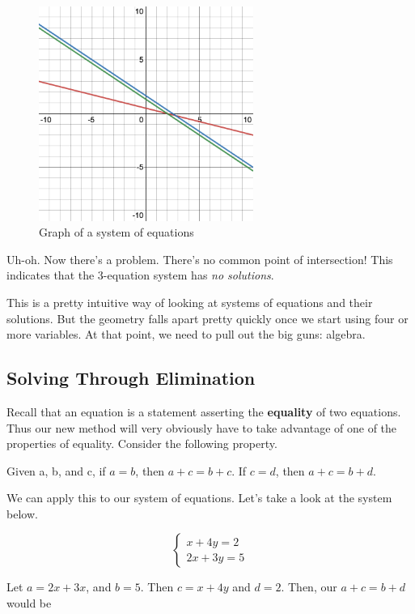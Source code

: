 \documentclass{scrbook}
\theoremstyle{definition}
\begin{document}
\begin{figure}[H]
  \includegraphics[width=7cm]{system-of-eqs(2).png}
  \centering
  \caption{Graph of a system of equations}
\end{figure}

Uh-oh. Now there's a problem. There's no common point of intersection! This indicates that the 3-equation system has \textit{no solutions}.

This is a pretty intuitive way of looking at systems of equations and their solutions. But the geometry falls apart pretty quickly once we start using four or more variables. At that point, we need to pull out the big guns: algebra. 

\subsection{Solving Through Elimination}

Recall that an equation is a statement asserting the \textbf{equality} of two equations. Thus our new method will very obviously have to take advantage of one of the properties of equality. Consider the following property. 

\begin{center}
  Given a, b, and c, if $a = b$, then $a + c = b + c$. If $c = d$, then $a + c = b + d$. 
\end{center}

We can apply this to our system of equations. Let's take a look at the system below. 

\[
  \begin{cases}
    x + 4y = 2\\
    2x + 3y = 5
  \end{cases}
\]

Let $a = 2x + 3x$, and $b = 5$. Then $c = x + 4y$ and $d = 2$. Then, our $a + c = b + d$ would be 
\end{document}
